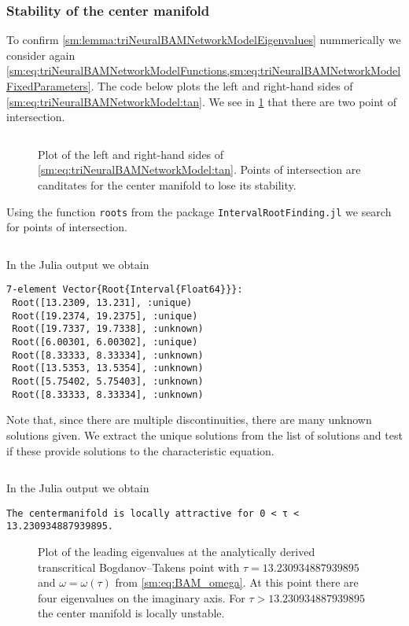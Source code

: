 \subsubsection{Stability of the center manifold}
To confirm \cref{sm:lemma:triNeuralBAMNetworkModelEigenvalues} nummerically we
consider again
\cref{sm:eq:triNeuralBAMNetworkModelFunctions,sm:eq:triNeuralBAMNetworkModelFixedParameters}.
The code below plots the left and right-hand sides of
\cref{sm:eq:triNeuralBAMNetworkModel:tan}. We see in
\cref{sm:fig:triNeuralBAMNetworkStabilityDeterminingFunction} that there are
two point of intersection.
\inputminted[firstline=421, lastline=439]{julia}{\pathToJuliaFiles/triNeuralBAMNetworkModel_simulation_article.jl}
\begin{figure}[ht]
    \centering
    \caption{Plot of the left and right-hand sides of
    \cref{sm:eq:triNeuralBAMNetworkModel:tan}. Points of intersection are
    canditates for the center manifold to lose its stability.}
    \label{sm:fig:triNeuralBAMNetworkStabilityDeterminingFunction}
\end{figure}
Using the function \texttt{roots} from the package {\tt IntervalRootFinding.jl}
we search for points of intersection. 
\inputminted[firstline=441, lastline=444]{julia}{\pathToJuliaFiles/triNeuralBAMNetworkModel_simulation_article.jl}
In the Julia output we obtain
\begin{verbatim}
7-element Vector{Root{Interval{Float64}}}:
 Root([13.2309, 13.231], :unique)
 Root([19.2374, 19.2375], :unique)
 Root([19.7337, 19.7338], :unknown)
 Root([6.00301, 6.00302], :unique)
 Root([8.33333, 8.33334], :unknown)
 Root([13.5353, 13.5354], :unknown)
 Root([5.75402, 5.75403], :unknown)
 Root([8.33333, 8.33334], :unknown)
\end{verbatim}
Note that, since there are multiple discontinuities, there are many unknown
solutions given. We extract the unique solutions from the list of solutions
and test if these provide solutions to the characteristic equation.
\inputminted[firstline=446, lastline=457]{julia}{\pathToJuliaFiles/triNeuralBAMNetworkModel_simulation_article.jl}
In the Julia output we obtain
\begin{verbatim}
The centermanifold is locally attractive for 0 < τ < 13.230934887939895.
\end{verbatim}

\begin{figure}[ht]
    \centering
    \caption{Plot of the leading eigenvalues at the analytically derived
    transcritical Bogdanov--Takens point with $\tau = 13.230934887939895$
    and $\omega = \omega(\tau)$ from \cref{sm:eq:BAM_omega}. At this
    point there are four eigenvalues on the imaginary axis. For
    $\tau > 13.230934887939895$ the center manifold is locally unstable.}
    \label{sm:fig:triNeuralBAMNetworkModelEigenvalues}
\end{figure}
